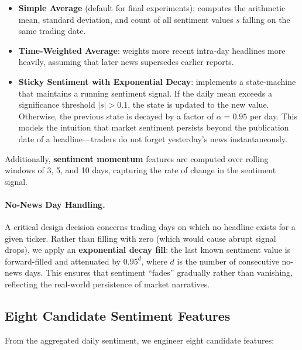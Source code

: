 \begin{itemize}
  \item \textbf{Simple Average} (default for final experiments): computes the
        arithmetic mean, standard deviation, and count of all sentiment values
        $s$ falling on the same trading date.

  \item \textbf{Time-Weighted Average}: weights more recent intra-day headlines
        more heavily, assuming that later news supersedes earlier reports.

  \item \textbf{Sticky Sentiment with Exponential Decay}: implements a
        state-machine that maintains a running sentiment signal.  If the daily
        mean exceeds a significance threshold $|s| > 0.1$, the state is updated
        to the new value.  Otherwise, the previous state is decayed by a factor
        of $\alpha = 0.95$ per day.  This models the intuition that market
        sentiment persists beyond the publication date of a headline---traders do
        not forget yesterday's news instantaneously.
\end{itemize}

Additionally, \textbf{sentiment momentum} features are computed over rolling
windows of 3, 5, and 10 days, capturing the rate of change in the sentiment
signal.

\paragraph{No-News Day Handling.}
A critical design decision concerns trading days on which no headline exists for
a given ticker.  Rather than filling with zero (which would cause abrupt signal
drops), we apply an \textbf{exponential decay fill}: the last known sentiment
value is forward-filled and attenuated by $0.95^d$, where $d$ is the number of
consecutive no-news days.  This ensures that sentiment ``fades'' gradually rather
than vanishing, reflecting the real-world persistence of market narratives.

\subsection{Eight Candidate Sentiment Features}
\label{sec:sentiment-features}

From the aggregated daily sentiment, we engineer eight candidate features:

